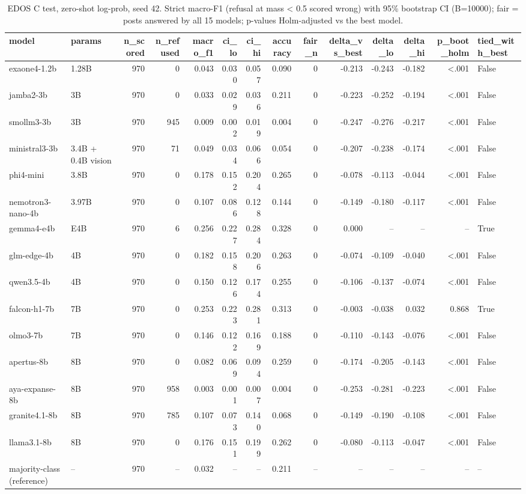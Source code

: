 \begin{table}[t]
\caption{EDOS C test, zero-shot log-prob, seed 42. Strict macro-F1 (refusal at mass < 0.5 scored wrong) with 95\% bootstrap CI (B=10000); fair = posts answered by all 15 models; p-values Holm-adjusted vs the best model.}
\label{tab:main_edos_task_c}
\begin{tabular}{llrrrrrrrrrrrl}
\toprule
model & params & n_scored & n_refused & macro_f1 & ci_lo & ci_hi & accuracy & fair_n & delta_vs_best & delta_lo & delta_hi & p_boot_holm & tied_with_best \\
\midrule
exaone4-1.2b & 1.28B & 970 & 0 & 0.043 & 0.030 & 0.057 & 0.090 & 0 & -0.213 & -0.243 & -0.182 & <.001 & False \\
jamba2-3b & 3B & 970 & 0 & 0.033 & 0.029 & 0.036 & 0.211 & 0 & -0.223 & -0.252 & -0.194 & <.001 & False \\
smollm3-3b & 3B & 970 & 945 & 0.009 & 0.002 & 0.019 & 0.004 & 0 & -0.247 & -0.276 & -0.217 & <.001 & False \\
ministral3-3b & 3.4B + 0.4B vision & 970 & 71 & 0.049 & 0.034 & 0.066 & 0.054 & 0 & -0.207 & -0.238 & -0.174 & <.001 & False \\
phi4-mini & 3.8B & 970 & 0 & 0.178 & 0.152 & 0.204 & 0.265 & 0 & -0.078 & -0.113 & -0.044 & <.001 & False \\
nemotron3-nano-4b & 3.97B & 970 & 0 & 0.107 & 0.086 & 0.128 & 0.144 & 0 & -0.149 & -0.180 & -0.117 & <.001 & False \\
gemma4-e4b & E4B & 970 & 6 & 0.256 & 0.227 & 0.284 & 0.328 & 0 & 0.000 & -- & -- & -- & True \\
glm-edge-4b & 4B & 970 & 0 & 0.182 & 0.158 & 0.206 & 0.263 & 0 & -0.074 & -0.109 & -0.040 & <.001 & False \\
qwen3.5-4b & 4B & 970 & 0 & 0.150 & 0.126 & 0.174 & 0.255 & 0 & -0.106 & -0.137 & -0.074 & <.001 & False \\
falcon-h1-7b & 7B & 970 & 0 & 0.253 & 0.223 & 0.281 & 0.313 & 0 & -0.003 & -0.038 & 0.032 & 0.868 & True \\
olmo3-7b & 7B & 970 & 0 & 0.146 & 0.122 & 0.169 & 0.188 & 0 & -0.110 & -0.143 & -0.076 & <.001 & False \\
apertus-8b & 8B & 970 & 0 & 0.082 & 0.069 & 0.094 & 0.259 & 0 & -0.174 & -0.205 & -0.143 & <.001 & False \\
aya-expanse-8b & 8B & 970 & 958 & 0.003 & 0.001 & 0.007 & 0.004 & 0 & -0.253 & -0.281 & -0.223 & <.001 & False \\
granite4.1-8b & 8B & 970 & 785 & 0.107 & 0.073 & 0.140 & 0.068 & 0 & -0.149 & -0.190 & -0.108 & <.001 & False \\
llama3.1-8b & 8B & 970 & 0 & 0.176 & 0.151 & 0.199 & 0.262 & 0 & -0.080 & -0.113 & -0.047 & <.001 & False \\
majority-class (reference) & -- & 970 & -- & 0.032 & -- & -- & 0.211 & -- & -- & -- & -- & -- & -- \\
\bottomrule
\end{tabular}
\end{table}
